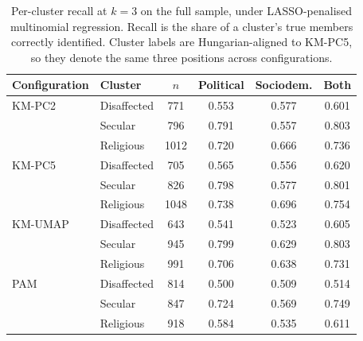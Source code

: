 \begin{table}[H]
\centering
\caption{Per-cluster recall at $k=3$ on the full sample, under LASSO-penalised multinomial regression. Recall is the share of a cluster's true members correctly identified. Cluster labels are Hungarian-aligned to KM-PC5, so they denote the same three positions across configurations.}
\label{tab:per-class}
\small
\begin{tabular}{llcccc}
\toprule
Configuration & Cluster & $n$ & Political & Sociodem. & Both \\
\midrule
KM-PC2 & Disaffected & 771 & 0.553 & 0.577 & 0.601 \\
 & Secular  & 796 & 0.791 & 0.557 & 0.803 \\
 & Religious & 1012 & 0.720 & 0.666 & 0.736 \\
\addlinespace
KM-PC5 & Disaffected & 705 & 0.565 & 0.556 & 0.620 \\
 & Secular  & 826 & 0.798 & 0.577 & 0.801 \\
 & Religious & 1048 & 0.738 & 0.696 & 0.754 \\
\addlinespace
KM-UMAP & Disaffected & 643 & 0.541 & 0.523 & 0.605 \\
 & Secular  & 945 & 0.799 & 0.629 & 0.803 \\
 & Religious & 991 & 0.706 & 0.638 & 0.731 \\
\addlinespace
PAM & Disaffected & 814 & 0.500 & 0.509 & 0.514 \\
 & Secular  & 847 & 0.724 & 0.569 & 0.749 \\
 & Religious & 918 & 0.584 & 0.535 & 0.611 \\
\bottomrule
\end{tabular}
\end{table}
